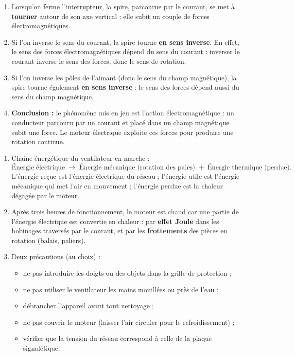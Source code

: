 \documentclass[11pt]{article}
\newcommand{\cle}[1]{{\popxbold\color{popdark}#1}}
\begin{document}
\begin{corrige}
\begin{enumerate}
\item Lorsqu'on ferme l'interrupteur, la spire, parcourue par le courant, se met à \textbf{tourner} autour de son axe vertical : elle subit un couple de forces électromagnétiques.
\item Si l'on inverse le sens du courant, la spire tourne \textbf{en sens inverse}. En effet, le sens des forces électromagnétiques dépend du sens du courant : inverser le courant inverse le sens des forces, donc le sens de rotation.
\item Si l'on inverse les pôles de l'aimant (donc le sens du champ magnétique), la spire tourne également \textbf{en sens inverse} : le sens des forces dépend aussi du sens du champ magnétique.
\item \textbf{Conclusion :} le phénomène mis en jeu est l'\cle{action électromagnétique} : un conducteur parcouru par un courant et placé dans un champ magnétique subit une force. Le moteur électrique exploite ces forces pour produire une rotation continue.
\end{enumerate}
\end{corrige}

\begin{corrige}
\begin{enumerate}
\item Chaîne énergétique du ventilateur en marche :
\[ \text{Énergie électrique} \;\longrightarrow\; \text{Énergie mécanique (rotation des pales)} \;+\; \text{Énergie thermique (perdue)}. \]
L'énergie reçue est l'énergie électrique du réseau ; l'énergie utile est l'énergie mécanique qui met l'air en mouvement ; l'énergie perdue est la chaleur dégagée par le moteur.
\item Après trois heures de fonctionnement, le moteur est chaud car une partie de l'énergie électrique est convertie en chaleur : par \textbf{effet Joule} dans les bobinages traversés par le courant, et par les \textbf{frottements} des pièces en rotation (balais, paliers).
\item Deux précautions (au choix) :
\begin{itemize}
\item ne pas introduire les doigts ou des objets dans la grille de protection ;
\item ne pas utiliser le ventilateur les mains mouillées ou près de l'eau ;
\item débrancher l'appareil avant tout nettoyage ;
\item ne pas couvrir le moteur (laisser l'air circuler pour le refroidissement) ;
\item vérifier que la tension du réseau correspond à celle de la plaque signalétique.
\end{itemize}
\end{enumerate}
\end{corrige}
\end{document}
